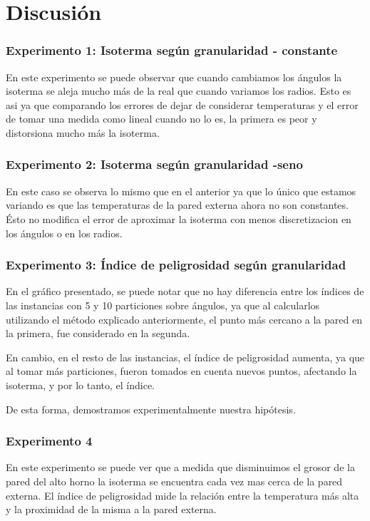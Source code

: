 \section{Discusión}

{
\subsubsection*{Experimento 1: Isoterma según granularidad - constante}
	En este experimento se puede observar que cuando cambiamos los ángulos la isoterma se aleja mucho más de la real que cuando variamos los radios. Esto es asi ya que comparando los errores de dejar de considerar temperaturas y el error de tomar una medida como lineal cuando no lo es, la primera es peor y distorsiona mucho más la isoterma.
	


\subsubsection*{Experimento 2: Isoterma según granularidad -seno}
	En este caso se observa lo mismo que en el anterior ya que lo único que estamos variando es que las temperaturas de la pared externa ahora no son constantes. Ésto no modifica el error de aproximar la isoterma con menos discretizacion en los ángulos o en los radios.



\subsubsection*{Experimento 3: Índice de peligrosidad según granularidad}
  	En el gráfico presentado, se puede notar que no hay diferencia entre los índices de las instancias con 5 y 10 particiones sobre ángulos, ya que al calcularlos utilizando el método explicado anteriormente, el punto más cercano a la pared en la primera, fue considerado en la segunda. 

  	En cambio, en el resto de las instancias, el índice de peligrosidad aumenta, ya que al tomar más particiones, fueron tomados en cuenta nuevos puntos, afectando la isoterma, y por lo tanto, el índice. 

  	De esta forma, demostramos experimentalmente nuestra hipótesis. 


\subsubsection*{Experimento 4}
	En este experimento se puede ver que a medida que disminuimos el grosor de la pared del alto horno la isoterma se encuentra cada vez mas cerca de la pared externa. El índice de peligrosidad mide la relación entre la temperatura más alta y la proximidad de la misma a la pared externa. 

}
